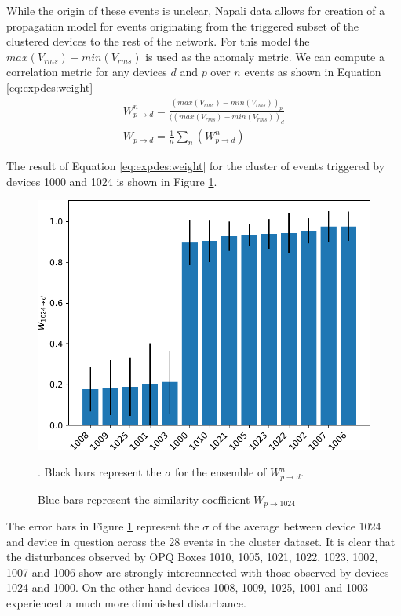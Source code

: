 While the origin of these events is unclear, Napali data allows for creation of a propagation model for events originating from the triggered subset of the clustered devices to the rest of the network.
For this model the $max(V_{rms}) - min(V_{rms})$ is used as the anomaly metric.
We can compute a correlation metric for any devices $d$ and $p$ over $n$ events as shown in Equation \ref{eq:expdes:weight}
\begin{equation} \label{eq:expdes:weight}
\begin{aligned}
    W^n_{p \rightarrow d} = \frac{(max(V_{rms}) - min(V_{rms}))_{p}}{((max(V_{rms}) - min(V_{rms}))_{d}} \\
    W_{p \rightarrow d} = \frac{1}{n}\sum_{n}(W^n_{p \rightarrow d})
\end{aligned}
\end{equation}

The result of Equation \ref{eq:expdes:weight} for the cluster of events triggered by devices 1000 and 1024 is shown in Figure \ref{fig:expdes:sub:fracto1024}.
\begin{figure}[ht!]
    \centering
    \includegraphics[width=0.8\linewidth]{img/napali_eval/subthreshold/clustering/1024toall.pdf}
    \caption{
    Blue bars represent the similarity coefficient $W_{p \rightarrow 1024}$}.
    Black bars represent the $\sigma$ for the ensemble of $W^n_{p \rightarrow d}$.
    \label{fig:expdes:sub:fracto1024}
\end{figure}

The error bars in Figure \ref{fig:expdes:sub:fracto1024} represent the $\sigma$ of the average between device 1024 and device in question across the 28 events in the cluster dataset.
It is clear that the disturbances observed by OPQ Boxes 1010, 1005, 1021, 1022, 1023, 1002, 1007 and 1006 show are strongly interconnected with those observed by devices 1024 and 1000.
On the other hand devices 1008, 1009, 1025, 1001 and 1003 experienced a much more diminished disturbance.

